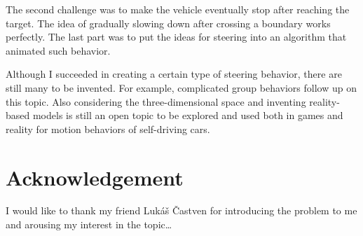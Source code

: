 \documentclass[10pt,twoside,english,a4paper]{article}
\begin{document}
The second challenge was to make the vehicle eventually stop after 
reaching the target. The idea of gradually slowing down after 
crossing a boundary works perfectly. The last part was to put the ideas
for steering into an algorithm that animated such behavior. 

Although I succeeded in creating a certain type of steering behavior,
there are still many to be invented. For example, complicated group behaviors
follow up on this topic. Also considering the three-dimensional space
and inventing reality-based models is still an open topic to be explored
and used both in games and reality for motion behaviors of 
self-driving cars.

\section*{Acknowledgement}
I would like to thank my friend Lukáš Častven for introducing 
the problem to me and arousing my interest in the topic\ldots


 
\end{document}

